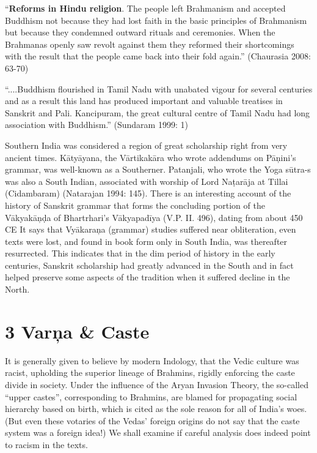 \vskip 2pt

\begin{myquote}
“\textbf{Reforms in Hindu religion}. The people left Brahmanism and accepted Buddhism not because they had lost faith in the basic principles of Brahmanism but because they condemned outward rituals and ceremonies. When the Brahmanas openly saw revolt against them they reformed their shortcomings with the result that the people came back into their fold again.” (Chaurasia 2008: 63-70)
\end{myquote}

\vskip 2pt

\begin{myquote}
“....Buddhism flourished in Tamil Nadu with unabated vigour for several centuries and as a result this land has produced important and valuable treatises in Sanskrit and Pali. Kancipuram, the great cultural centre of Tamil Nadu had long association with Buddhism.” (Sundaram 1999: 1)
\end{myquote}

\vskip 2pt

Southern India was considered a region of great scholarship right from very ancient times. Kātyāyana, the Vārtikakāra who wrote addendums on Pāņini’s grammar, was well-known as a Southerner. Patanjali, who wrote the Yoga sūtra-s was also a South Indian, associated with worship of Lord Naṭarāja at Tillai (Cidambaram) (Natarajan 1994: 145). There is an interesting account of the history of Sanskrit grammar that forms the concluding portion of the Vākyakāņḍa of Bhartrhari’s Vākyapadīya (V.P. II. 496), dating from about 450 CE It says that Vyākaraņa (grammar) studies suffered near obliteration, even texts were lost, and found in book form only in South India, was thereafter resurrected. This indicates that in the dim period of history in the early centuries, Sanskrit scholarship had greatly advanced in the South and in fact helped preserve some aspects of the tradition when it suffered decline in the North.

\vskip 2pt


\section*{3 Varņa \& Caste}

It is generally given to believe by modern Indology, that the Vedic culture was racist, upholding the superior lineage of Brahmins, rigidly enforcing the caste divide in society. Under the influence of the Aryan Invasion Theory, the so-called “upper castes”, corresponding to Brahmins, are blamed for propagating social hierarchy based on birth, which is cited as the sole reason for all of India’s woes. (But even these votaries of the Vedas’ foreign origins do not say that the caste system was a foreign idea!) We shall examine if careful analysis does indeed point to racism in the texts.

